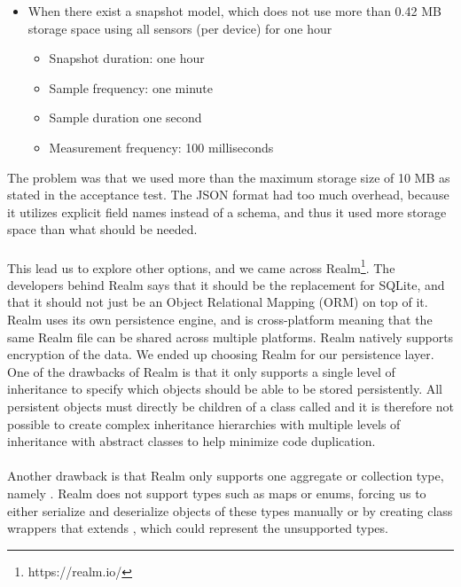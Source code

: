 \begin{itemize}[noitemsep]
   \item When there exist a snapshot model, which does not use more than 0.42 MB storage space using all sensors (per device) for one hour
   \begin{itemize}[noitemsep,topsep=0pt,parsep=0pt,partopsep=0pt]
      \item Snapshot duration: one hour
      \item Sample frequency: one minute
      \item Sample duration one second
      \item Measurement frequency: 100 milliseconds
   \end{itemize}
\end{itemize}

The problem was that we used more than the maximum storage size of 10 MB as stated in the acceptance test. The JSON format had too much overhead, because it utilizes explicit field names instead of a schema, and thus it used more storage space than what should be needed. 
\\\\
This lead us to explore other options, and we came across Realm\footnote{https://realm.io/}. The developers behind Realm says that it should be the replacement for SQLite, and that it should not just be an Object Relational Mapping (ORM) on top of it. Realm uses its own persistence engine, and is cross-platform meaning that the same Realm file can be shared across multiple platforms. Realm natively supports encryption of the data. We ended up choosing Realm for our persistence layer. One of the drawbacks of Realm is that it only supports a single level of inheritance to specify which objects should be able to be stored persistently. All persistent objects must directly be children of a class called  and it is therefore not possible to create complex inheritance hierarchies with multiple levels of inheritance with abstract classes to help minimize code duplication.  
\\\\
Another drawback is that Realm only supports one aggregate or collection type, namely . Realm does not support types such as maps or enums, forcing us to either serialize and deserialize objects of these types manually or by creating class wrappers that extends , which could represent the unsupported types.


\FloatBarrier

